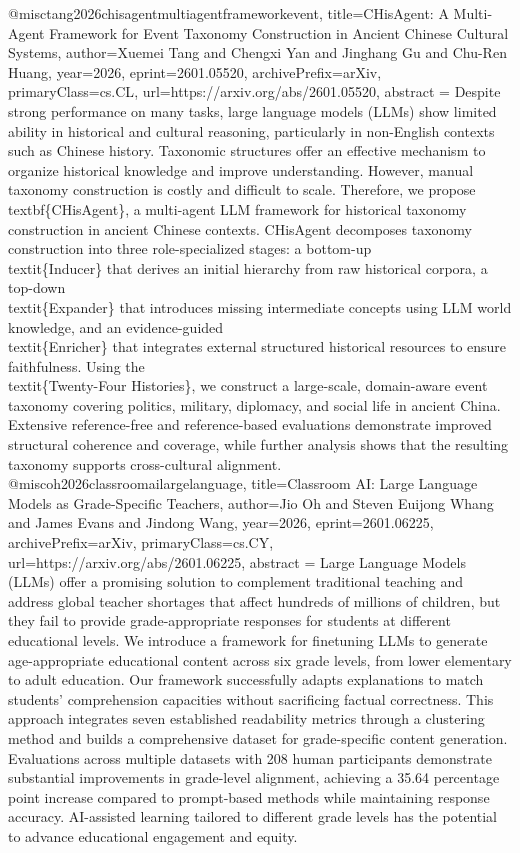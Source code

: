 {}@misc{tang2026chisagentmultiagentframeworkevent,
      title={CHisAgent: A Multi-Agent Framework for Event Taxonomy Construction in Ancient Chinese Cultural Systems}, 
      author={Xuemei Tang and Chengxi Yan and Jinghang Gu and Chu-Ren Huang},
      year={2026},
      eprint={2601.05520},
      archivePrefix={arXiv},
      primaryClass={cs.CL},
      url={https://arxiv.org/abs/2601.05520},
      abstract = {Despite strong performance on many tasks, large language models (LLMs) show limited ability in historical and cultural reasoning, particularly in non-English contexts such as Chinese history. Taxonomic structures offer an effective mechanism to organize historical knowledge and improve understanding. However, manual taxonomy construction is costly and difficult to scale. Therefore, we propose \\textbf\{CHisAgent\}, a multi-agent LLM framework for historical taxonomy construction in ancient Chinese contexts. CHisAgent decomposes taxonomy construction into three role-specialized stages: a bottom-up \\textit\{Inducer\} that derives an initial hierarchy from raw historical corpora, a top-down \\textit\{Expander\} that introduces missing intermediate concepts using LLM world knowledge, and an evidence-guided \\textit\{Enricher\} that integrates external structured historical resources to ensure faithfulness. Using the \\textit\{Twenty-Four Histories\}, we construct a large-scale, domain-aware event taxonomy covering politics, military, diplomacy, and social life in ancient China. Extensive reference-free and reference-based evaluations demonstrate improved structural coherence and coverage, while further analysis shows that the resulting taxonomy supports cross-cultural alignment.}
}@misc{oh2026classroomailargelanguage,
      title={Classroom AI: Large Language Models as Grade-Specific Teachers}, 
      author={Jio Oh and Steven Euijong Whang and James Evans and Jindong Wang},
      year={2026},
      eprint={2601.06225},
      archivePrefix={arXiv},
      primaryClass={cs.CY},
      url={https://arxiv.org/abs/2601.06225},
      abstract = {Large Language Models (LLMs) offer a promising solution to complement traditional teaching and address global teacher shortages that affect hundreds of millions of children, but they fail to provide grade-appropriate responses for students at different educational levels. We introduce a framework for finetuning LLMs to generate age-appropriate educational content across six grade levels, from lower elementary to adult education. Our framework successfully adapts explanations to match students' comprehension capacities without sacrificing factual correctness. This approach integrates seven established readability metrics through a clustering method and builds a comprehensive dataset for grade-specific content generation. Evaluations across multiple datasets with 208 human participants demonstrate substantial improvements in grade-level alignment, achieving a 35.64 percentage point increase compared to prompt-based methods while maintaining response accuracy. AI-assisted learning tailored to different grade levels has the potential to advance educational engagement and equity.}
}

